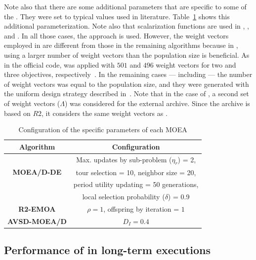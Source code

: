 Note also that there are some additional parameters that are specific to some of the \MOEAS{}.
%
They were set to typical values used in literature. 
%
Table~\ref{tab:Parametrization} shows this additional parameterization.
%
Note also that scalarization functions are used in \MOEADDE{}, \RMOEA{}, \NSGAIII{} and \AVSDMOEAD{}.
%
In all those cases, the \ASF{} approach is used.
%
However, the weight vectors employed in \RMOEA{} are different from those in the remaining algorithms because in \RMOEA{}, using
a larger number of weight vectors than the population size is beneficial.
%
As in the official code, \RMOEA{} was applied with $501$ and $496$ weight vectors for two and three objectives, 
respectively~\cite{trautmann2013r2}.
%
In the remaining cases --- including \AVSDMOEAD{} --- the number of weight vectors was equal to the population size, and they were generated
with the uniform design strategy described in~\cite{wagner:13}.
%
Note that in the case of \AVSDMOEAD{}, a second set of weight vectors ($\Lambda$) was considered for the external archive.
%
Since the archive is based on $R2$, it considers the same weight vectors as \RMOEA{}.

\begin{table}[t]
\centering
\caption{Configuration of the specific parameters of each MOEA}
\label{tab:Parametrization}
\begin{scriptsize}
\begin{tabular}{c|c}
\hline
\textbf{Algorithm} & \textbf{Configuration} \\ \hline
\multirow{3}{*}{
\textbf{MOEA/D-DE}} & Max. updates by sub-problem ($\eta_r$) = 2, \\
 & tour selection = 10,   neighbor size = 20, \\
 & period utility updating = 50 generations, \\
 & local selection probability ($\delta$) = 0.9\\ \hline
\textbf{R2-EMOA} & $\rho=1$, offspring by iteration = $1$ \\ \hline
\textbf{AVSD-MOEA/D} & $D_I=0.4$ \\ \hline
\end{tabular}
\end{scriptsize}
\end{table}





\subsection{Performance of \MOEAS{} in long-term executions}

